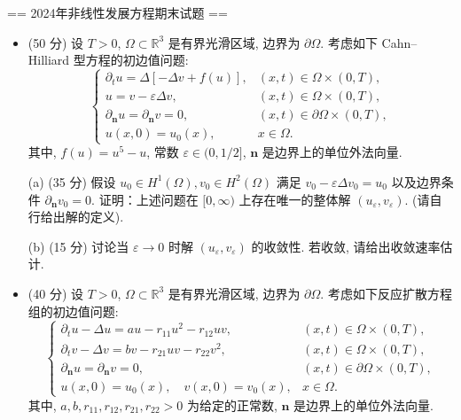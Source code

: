 
== 2024年非线性发展方程期末试题 ==

\begin{itemize}
\item[一.] (50 分) 设 $T>0$, $\Omega \subset \mathbb{R}^{3}$ 是有界光滑区域, 
边界为 $\partial \Omega$. 考虑如下 Cahn--Hilliard 型方程的初边值问题:
$$\begin{cases}\partial_{t} u=\Delta[-\Delta v+f(u)], & (x, t) \in \Omega \times(0, T), \\ 
    u=v-\varepsilon \Delta v, & (x, t) \in \Omega \times(0, T), \\ 
    \partial_{\boldsymbol{n}} u=\partial_{\boldsymbol{n}} v=0, & (x, t) \in \partial \Omega \times(0, T), \\ 
    u(x, 0)=u_{0}(x), & x \in \Omega .\end{cases}$$
其中, $f(u)=u^{5}-u$, 常数 $\varepsilon \in(0,1/2]$, $\boldsymbol{n}$ 是边界上的单位外法向量.

(a) (35 分) 假设 $u_{0} \in H^{1}(\Omega), v_{0} \in H^{2}(\Omega)$ 
满足 $v_{0}-\varepsilon \Delta v_{0}=u_{0}$ 以及边界条件 $\partial_{\boldsymbol{n}} v_{0}= 0$. 
证明：上述问题在 $[0, \infty)$ 上存在唯一的整体解 $(u_{\varepsilon}, v_{\varepsilon})$. (请自行给出解的定义).

(b) (15 分) 讨论当 $\varepsilon \rightarrow 0$ 时解 $(u_{\varepsilon}, v_{\varepsilon})$ 的收敛性. 若收敛, 请给出收敛速率估计.

\item[二.] (40 分) 设 $T>0$, $\Omega \subset \mathbb{R}^{3}$ 是有界光滑区域, 
边界为 $\partial \Omega$. 考虑如下反应扩散方程组的初边值问题:
$$\begin{cases}\partial_{t} u-\Delta u=a u-r_{11} u^{2}-r_{12} u v, & (x, t) \in \Omega \times(0, T), \\ 
    \partial_{t} v-\Delta v=b v-r_{21} u v-r_{22} v^{2}, & (x, t) \in \Omega \times(0, T), \\ 
    \partial_{\boldsymbol{n}} u=\partial_{\boldsymbol{n}} v=0, & (x, t) \in \partial \Omega \times(0, T), \\
    u(x, 0)=u_{0}(x), \quad v(x, 0)=v_{0}(x), & x \in \Omega .\end{cases}$$
其中, $a, b, r_{11}, r_{12}, r_{21}, r_{22}>0$ 为给定的正常数, 
$\boldsymbol{n}$ 是边界上的单位外法向量.


\end{itemize}
